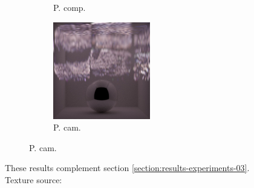 \begin{figure}[]
\begin{subfigure}{\textwidth}
\begin{subfigure}{0.19\textwidth}
            \caption*{P. comp.}
        \end{subfigure}
        \hfill
        \begin{subfigure}{0.19\textwidth}
            \centering
            \includegraphics[width=\textwidth]{images/04-experiment03/ball_dof/beams/pixel_proj.jpg}
            \caption*{P. cam.}
        \end{subfigure}
    \end{subfigure}
    \caption{These results complement section \ref{section:results-experiments-03}. Texture source: \citet{Pixar128}}
    \label{fig:ex03-complete-ball_dof}
\end{figure}


